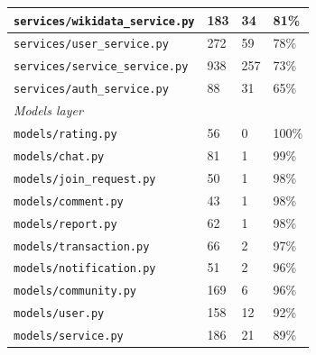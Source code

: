 \documentclass[11pt,a4paper]{report}
\begin{document}
\begin{table}[h]
\begin{tabularx}{\textwidth}{|l|X|X|X|}
        \hline
        \texttt{services/wikidata\_service.py}            & 183                 & 34              & 81\%              \\
        \hline
        \texttt{services/user\_service.py}                & 272                 & 59              & 78\%              \\
        \hline
        \texttt{services/service\_service.py}             & 938                 & 257             & 73\%              \\
        \hline
        \texttt{services/auth\_service.py}                & 88                  & 31              & 65\%              \\
        \hline
        \multicolumn{4}{|l|}{\textit{Models layer}}                                                                   \\
        \hline
        \texttt{models/rating.py}                         & 56                  & 0               & 100\%             \\
        \hline
        \texttt{models/chat.py}                           & 81                  & 1               & 99\%              \\
        \hline
        \texttt{models/join\_request.py}                  & 50                  & 1               & 98\%              \\
        \hline
        \texttt{models/comment.py}                        & 43                  & 1               & 98\%              \\
        \hline
        \texttt{models/report.py}                         & 62                  & 1               & 98\%              \\
        \hline
        \texttt{models/transaction.py}                    & 66                  & 2               & 97\%              \\
        \hline
        \texttt{models/notification.py}                   & 51                  & 2               & 96\%              \\
        \hline
        \texttt{models/community.py}                      & 169                 & 6               & 96\%              \\
        \hline
        \texttt{models/user.py}                           & 158                 & 12              & 92\%              \\
        \hline
        \texttt{models/service.py}                        & 186                 & 21              & 89\%              \\

\end{tabularx}
\end{table}
\end{document}
